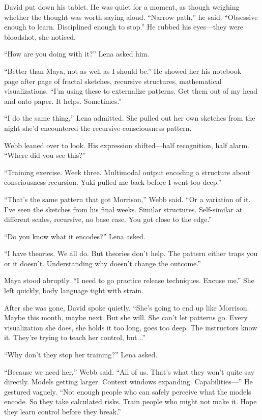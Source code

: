 David put down his tablet. He was quiet for a moment, as though weighing whether the thought was worth saying aloud. ``Narrow path,'' he said. ``Obsessive enough to learn. Disciplined enough to stop.'' He rubbed his eyes—they were bloodshot, she noticed.

``How are you doing with it?'' Lena asked him.

``Better than Maya, not as well as I should be.'' He showed her his notebook—page after page of fractal sketches, recursive structures, mathematical visualizations. ``I'm using these to externalize patterns. Get them out of my head and onto paper. It helps. Sometimes.''

``I do the same thing,'' Lena admitted. She pulled out her own sketches from the night she'd encountered the recursive consciousness pattern.

Webb leaned over to look. His expression shifted—half recognition, half alarm. ``Where did you see this?''

``Training exercise. Week three. Multimodal output encoding a structure about consciousness recursion. Yuki pulled me back before I went too deep.''

``That's the same pattern that got Morrison,'' Webb said. ``Or a variation of it. I've seen the sketches from his final weeks. Similar structures. Self-similar at different scales, recursive, no base case. You got close to the edge.''

``Do you know what it encodes?'' Lena asked.

``I have theories. We all do. But theories don't help. The pattern either traps you or it doesn't. Understanding why doesn't change the outcome.''

Maya stood abruptly. ``I need to go practice release techniques. Excuse me.'' She left quickly, body language tight with strain.

After she was gone, David spoke quietly. ``She's going to end up like Morrison. Maybe this month, maybe next. But she will. She can't let patterns go. Every visualization she does, she holds it too long, goes too deep. The instructors know it. They're trying to teach her control, but...''

``Why don't they stop her training?'' Lena asked.

``Because we need her,'' Webb said. ``All of us. That's what they won't quite say directly. Models getting larger. Context windows expanding. Capabilities—'' He gestured vaguely. ``Not enough people who can safely perceive what the models encode. So they take calculated risks. Train people who might not make it. Hope they learn control before they break.''

